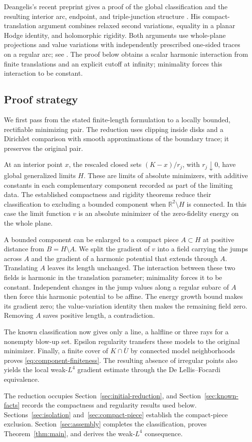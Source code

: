 Deangelis's recent preprint gives a proof of the global classification and
the resulting interior arc, endpoint, and triple-junction structure
\cite[Theorems~1.1 and~3.4]{deangelis2026}. His compact-translation
argument combines relaxed second variations, equality in a planar Hodge
identity, and holomorphic rigidity. Both arguments use whole-plane
projections and value variations with independently prescribed one-sided
traces on a regular arc; see \cite[Section~3.2]{deangelis2026}.
The proof below obtains a scalar harmonic interaction from finite
translations and an explicit cutoff at infinity; minimality forces this
interaction to be constant.

\subsection{Proof strategy}
We first pass from the stated finite-length formulation to a locally
bounded, rectifiable minimizing pair.  The reduction uses clipping inside
disks and a Dirichlet comparison with smooth approximations of the boundary
trace; it preserves the original pair.

At an interior point $x$, the rescaled closed sets $(K-x)/r_j$, with
$r_j\downarrow0$, have global generalized limits $H$.  These are limits
of absolute minimizers, with additive constants in each complementary
component recorded as part of the limiting data.  The established
compactness and rigidity theorems reduce their classification to excluding
a bounded component when $\mathbb R^2\setminus H$ is connected.  In this
case the limit function $v$ is an absolute minimizer of the zero-fidelity
energy on the whole plane.

A bounded component can be enlarged to a compact piece $A\subset H$ at
positive distance from $B=H\setminus A$.  We split the gradient of $v$
into a field carrying the jumps across $A$ and the gradient of a harmonic
potential that extends through $A$.  Translating $A$ leaves its length unchanged.  The
interaction between these two fields is harmonic in the translation
parameter; minimality forces it to be constant.  Independent changes in
the jump values along a regular subarc of $A$ then force this harmonic
potential to be affine.  The energy growth bound makes its gradient zero;
the value-variation identity then makes the remaining field zero.
Removing $A$ saves positive length, a contradiction.

The known classification now gives only a line, a halfline or three rays
for a nonempty blow-up set.  Epsilon regularity transfers these models to
the original minimizer.  Finally, a finite cover of $K\cap\overline U$ by
connected model neighborhoods proves \eqref{eq:component-finiteness}.
The resulting absence of irregular points also yields the local weak-$L^4$
gradient estimate through the De Lellis--Focardi equivalence.

The reduction occupies Section~\ref{sec:initial-reduction}, and
Section~\ref{sec:known-facts} records the compactness and regularity
results used below.  Sections~\ref{sec:isolation} and~\ref{sec:compact-piece} establish
the compact-piece exclusion.  Section~\ref{sec:assembly} completes the
classification, proves Theorem~\ref{thm:main}, and derives the weak-$L^4$
consequence.
